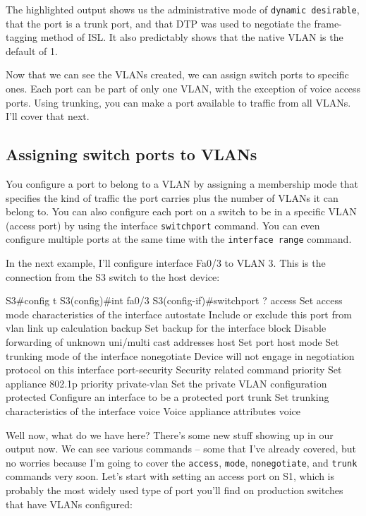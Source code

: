 The highlighted output shows us the administrative mode of
\texttt{dynamic\ desirable}, that the port is a trunk port, and that DTP was used to negotiate the frame-tagging method of ISL.
It also predictably shows that the native VLAN is the default of 1.

Now that we can see the VLANs created, we can assign switch ports to specific ones.
Each port can be part of only one VLAN, with the exception of voice access ports.
Using trunking, you can make a port available to traffic from all VLANs.
I'll cover that next.

\subsection{Assigning switch ports to VLANs}

You configure a port to belong to a VLAN by assigning a membership mode
that specifies the kind of traffic the port carries plus the number of
VLANs it can belong to. You can also configure each port on a switch to
be in a specific VLAN (access port) by using the interface
\texttt{switchport} command. You can even configure multiple ports at
the same time with the \texttt{interface\ range} command.

In the next example, I'll configure interface Fa0/3 to VLAN 3. This is
the connection from the S3 switch to the host device:

\begin{cli}
S3#config t
S3(config)#int fa0/3
S3(config-if)#switchport ?
  access         Set access mode characteristics of the interface
  autostate      Include or exclude this port from vlan link up calculation
  backup         Set backup for the interface
  block          Disable forwarding of unknown uni/multi cast addresses
  host           Set port host
  mode           Set trunking mode of the interface
  nonegotiate    Device will not engage in negotiation protocol on this
                 interface
  port-security  Security related command
  priority       Set appliance 802.1p priority
  private-vlan   Set the private VLAN configuration
  protected      Configure an interface to be a protected port
  trunk          Set trunking characteristics of the interface
  voice          Voice appliance attributes voice
\end{cli}

Well now, what do we have here? There's some new stuff showing up in our
output now. We can see various commands -- some that I've already
covered, but no worries because I'm going to cover the \texttt{access},
\texttt{mode}, \texttt{nonegotiate}, and \texttt{trunk} commands very
soon. Let's start with setting an access port on S1, which is probably
the most widely used type of port you'll find on production switches
that have VLANs configured:

